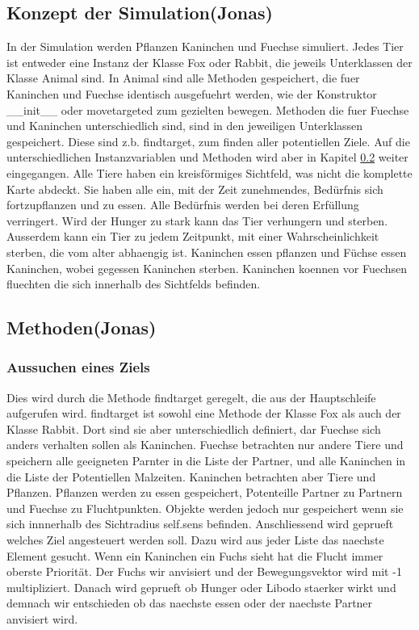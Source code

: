 \documentclass[12pt]{article}
\begin{document}
\subsection{Konzept der Simulation(Jonas)}
In der Simulation werden Pflanzen Kaninchen und Fuechse simuliert.
Jedes Tier ist entweder eine Instanz der Klasse \colorbox{gray!40}{Fox} oder
\colorbox{gray!40}{Rabbit}, die jeweils Unterklassen der Klasse
\colorbox{gray!40}{Animal} sind.
In Animal sind alle Methoden gespeichert, die fuer Kaninchen und Fuechse
identisch ausgefuehrt werden, wie der Konstruktor
\colorbox{gray!40}{\_\_init\_\_} oder \colorbox{gray!40}{movetargeted} zum gezielten bewegen.
Methoden die fuer Fuechse und Kaninchen unterschiedlich sind, sind in den
jeweiligen Unterklassen gespeichert.
Diese sind z.b. \colorbox{gray!40}{findtarget}, zum finden aller potentiellen Ziele.
Auf die unterschiedlichen Instanzvariablen und Methoden wird aber in Kapitel \ref{methoden} weiter eingegangen.
Alle Tiere haben ein kreisförmiges Sichtfeld, was nicht die komplette Karte abdeckt.
Sie haben alle ein, mit der Zeit zunehmendes, Bedürfnis sich fortzupflanzen und zu essen.
Alle Bedürfnis werden bei deren Erfüllung verringert.
Wird der Hunger zu stark kann das Tier verhungern und sterben.
Ausserdem kann ein Tier zu jedem Zeitpunkt, mit einer Wahrscheinlichkeit sterben, die vom alter abhaengig ist.
Kaninchen essen pflanzen und Füchse essen Kaninchen, wobei gegessen Kaninchen sterben.
Kaninchen koennen vor Fuechsen fluechten die sich innerhalb des Sichtfelds befinden.

\subsection{Methoden(Jonas)}
\label{methoden}
\subsubsection{Aussuchen eines Ziels}
Dies wird durch die Methode \colorbox{gray!40}{findtarget} geregelt, die aus der Hauptschleife aufgerufen wird.
\colorbox{gray!40}{findtarget} ist sowohl eine Methode der Klasse
\colorbox{gray!40}{Fox} als auch der Klasse \colorbox{gray!40}{Rabbit}.
Dort sind sie aber unterschiedlich definiert, dar Fuechse sich anders verhalten sollen als Kaninchen.
Fuechse betrachten nur andere Tiere und speichern alle geeigneten Parnter in die Liste der Partner, und alle Kaninchen in die Liste der Potentiellen Malzeiten.
Kaninchen betrachten aber Tiere und Pflanzen.
Pflanzen werden zu essen gespeichert, Potenteille Partner zu Partnern und Fuechse zu Fluchtpunkten.
Objekte werden jedoch nur gespeichert wenn sie sich innnerhalb des Sichtradius \colorbox{gray!40}{self.sens} befinden.
Anschliessend wird geprueft welches Ziel angesteuert werden soll.
Dazu wird aus jeder Liste das naechste Element gesucht.
Wenn ein Kaninchen ein Fuchs sieht hat die Flucht immer oberste Priorität.
Der Fuchs wir anvisiert und der Bewegungsvektor wird mit -1 multipliziert.
Danach wird geprueft ob Hunger oder Libodo staerker wirkt und demnach wir
entschieden ob das naechste essen oder der naechste Partner anvisiert wird.
\end{document}
